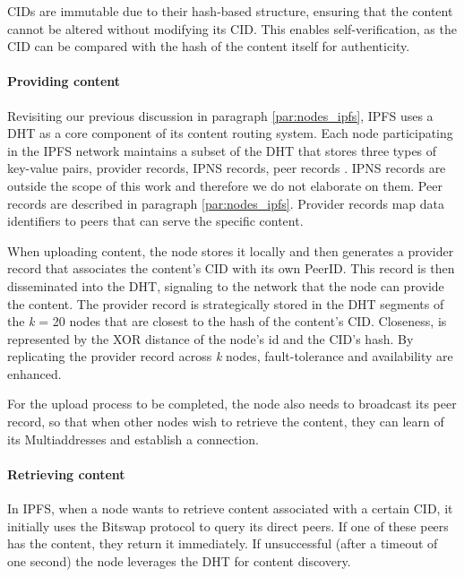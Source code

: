 CIDs are immutable due to their hash-based structure, ensuring that the content cannot be altered without modifying its CID. This enables self-verification, as the CID can be compared with the hash of the content itself for authenticity.

\paragraph{Providing content}\label{par:providing_ipfs}
Revisiting our previous discussion in paragraph \ref{par:nodes_ipfs}, IPFS uses a DHT as a core component of its content routing system. Each node participating in the IPFS network maintains a subset of the DHT that stores three types of key-value pairs, provider records, IPNS records, peer records \citep{schmahmann_2020}. IPNS records are outside the scope of this work and therefore we do not elaborate on them. Peer records are described in paragraph \ref{par:nodes_ipfs}. Provider records map data identifiers to peers that can serve the specific content.

When uploading content, the node stores it locally and then generates a provider record that associates the content's CID with its own PeerID. This record is then disseminated into the DHT, signaling to the network that the node can provide the content. The provider record is strategically stored in the DHT segments of the \textit{k} = 20 nodes that are closest to the hash of the content's CID. Closeness, is represented by the XOR distance \citep{maymounkov_2002} of the node's id and the CID's hash. By replicating the provider record across \textit{k} nodes, fault-tolerance and availability are enhanced. 

For the upload process to be completed, the node also needs to broadcast its peer record, so that when other nodes wish to retrieve the content, they can learn of its Multiaddresses and establish a connection.

\paragraph{Retrieving content}\label{par:retrieving_ipfs}
In IPFS, when a node wants to retrieve content associated with a certain CID, it initially uses the Bitswap protocol to query its direct peers.  If one of these peers has the content, they return it immediately. If unsuccessful (after a timeout of one second) the node leverages the DHT for content discovery.

